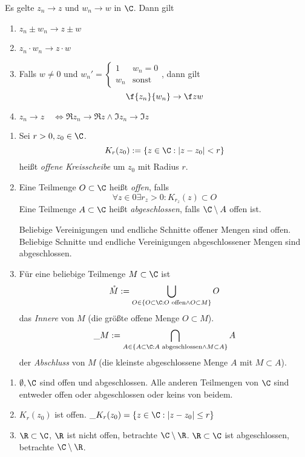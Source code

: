 \documentclass[a4paper,10pt]{scrartcl}
\begin{document}
\begin{st}
	\label{st:1.6}
	Es gelte $z_n\to z$ und $w_n \to w$ in $\C$.
	Dann gilt
	\begin{enumerate}
		\item $z_n \pm w_n \to z \pm w$ 
		\item $z_n\cdot w_n \to z\cdot w$
		\item
			Falls $w\neq 0$ und $w_n' = \begin{cases} 1 & w_n=0 \\ w_n & \text{sonst}\end{cases}$, dann gilt
			\[
				\f {z_n}{w_n} \to \f zw
			\]
		\item $z_n\to z \quad\iff \Re z_n \to \Re z \land  \Im z_n \to \Im z$

	\end{enumerate}
\end{st}

\begin{df}
	\label{df:1.7}
	\begin{enumerate}
		\item 
			Sei $r> 0, z_0\in \C$.
			\[
				K_r(z_0) := \{z\in \C : |z-z_0| < r\}
			\]
			heißt \emph{offene Kreisscheibe} um $z_0$ mit Radius $r$.
		\item
			Eine Teilmenge $O \subset \C$ heißt \emph{offen}, falls
			\[
				\forall z\in 0 \exists r_z > 0 : K_{r_z}(z) \subset O
			\]
			Eine Teilmenge $A \subset \C$ heißt \emph{abgeschlossen}, falls $\C\setminus A$ offen ist.

			Beliebige Vereinigungen und endliche Schnitte offener Mengen sind offen.
			Beliebige Schnitte und endliche Vereinigungen abgeschlossener Mengen sind abgeschlossen.
		\item
			Für eine beliebige Teilmenge $M\subset \C$ ist
			\[
				\mathring M := \bigcup_{O\in \{O\subset \C: O \text{ offen} \land O \subset M\}} O
			\]
			das \emph{Innere} von $M$ (die größte offene Menge $O\subset M$).
			\[
				\_M := \bigcap_{A\in \{A\subset \C: A \text{ abgeschlossen} \land M \subset A\}} A
			\]
			der \emph{Abschluss} von $M$ (die kleinste abgeschlossene Menge $A$ mit $M\subset A$).
	\end{enumerate}
\end{df}

\begin{ex}
	\label{ex:1.8}
	\begin{enumerate}
		\item 
			$\emptyset, \C$ sind offen und abgeschlossen. 
			Alle anderen Teilmengen von $\C$ sind entweder offen oder abgeschlossen oder keins von beidem.
		\item
			$K_r(z_0)$ ist offen. $\_{K_r(z_0)}=\{z\in \C : |z -z_0| \le r\}$
		\item
			$\R\subset \C$, $\R$ ist nicht offen, betrachte $\C\setminus \R$.
			$\R\subset \C$ ist abgeschlossen, betrachte $\C\setminus \R$.			
	\end{enumerate}
\end{ex}
\end{document}
